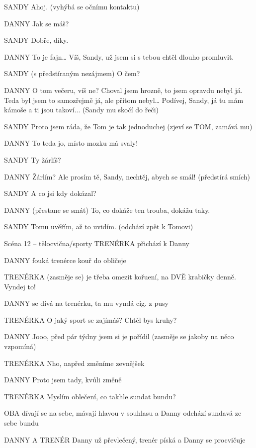SANDY        Ahoj. (vyhýbá se očnímu kontaktu) 

DANNY        Jak se máš? 

SANDY        Dobře, díky. 

DANNY        To je fajn… Víš, Sandy, už jsem si s tebou chtěl dlouho promluvit. 

SANDY         (s předstíraným nezájmem) O čem? 

DANNY         O tom večeru, víš ne? Choval jsem hrozně, to jsem opravdu nebyl já.         Teda byl jsem to samozřejmě já, ale přitom nebyl… Podívej, Sandy, já tu         mám kámoše a ti jsou takoví... (Sandy mu skočí do řeči) 

SANDY        Proto jsem ráda, že Tom je tak jednoduchej (zjeví se TOM, zamává  mu) 

DANNY         To teda jo, místo mozku má svaly! 

SANDY         Ty žárlíš? 

DANNY        Žárlím? Ale prosím tě, Sandy, nechtěj, abych se smál! (předstírá smích) 

SANDY         A co jsi kdy dokázal? 

DANNY         (přestane se smát) To, co dokáže ten trouba, dokážu taky. 

SANDY        Tomu uvěřím, až to uvidím. (odchází zpět k Tomovi) 

Scéna 12 – tělocvična/sporty TRENÉRKA        přichází k Danny 

DANNY        fouká trenérce kouř do obličeje

TRENÉRKA        (zasměje se) je třeba omezit kořuení, na DVĚ krabičky denně. Vyndej to!

DANNY        se dívá na trenérku, ta mu vyndá cig. z pusy 

TRENÉRKA        O jaký sport se zajímáš? Chtěl bys kruhy?

DANNY        Jooo, před pár týdny jsem si je pořídil (zasměje se jakoby na něco                 vzpomíná)

TRENÉRKA        Nho, napřed změníme zevnějšek

DANNY        Proto jsem tady, kvůli změně 

TRENÉRKA        Myslím oblečení, co takhle sundat bundu?  

OBA        dívají se na sebe, mávají hlavou v souhlasu a Danny odchází sundavá        ze sebe bundu

DANNY A TRENÉR         Danny už převlečený, trenér píská a Danny se procvičuje

